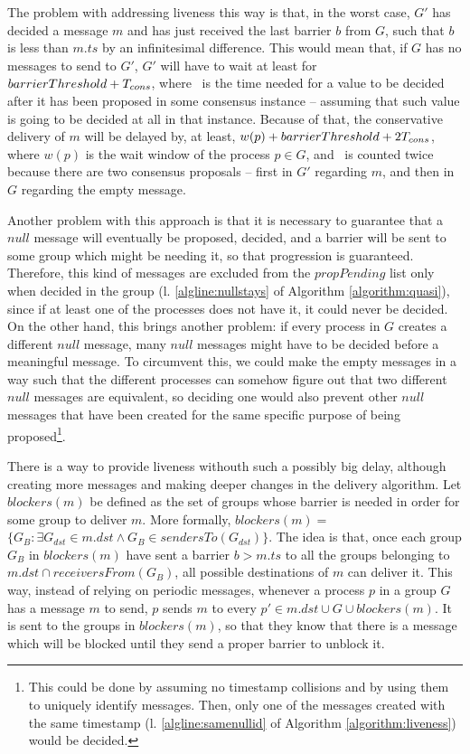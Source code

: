 \documentclass[times, 10pt]{article}
\begin{document}
The problem with addressing liveness this way is that, in the worst case, $G'$ has decided a message $m$ and has just received the last barrier $b$ from $G$, such that $b$ is less than $m.ts$ by an infinitesimal difference. This would mean that, if $G$ has no messages to send to $G'$, $G'$ will have to wait at least for $barrierThreshold + T_{cons}$, where \tcons\ is the time needed for a value to be decided after it has been proposed in some consensus instance -- assuming that such value is going to be decided at all in that instance. Because of that, the conservative delivery of $m$ will be delayed by, at least, $w(p) + barrierThreshold + 2T_{cons}$, where $w(p)$ is the wait window of the process $p \in G$, and \tcons\ is counted twice because there are two consensus proposals -- first in $G'$ regarding $m$, and then in $G$ regarding the empty message.

Another problem with this approach is that it is necessary to guarantee that a $null$ message will eventually be proposed, decided, and a barrier will be sent to some group which might be needing it, so that progression is guaranteed. Therefore, this kind of messages are excluded from the $propPending$ list only when decided in the group (l. \ref{algline:nullstays} of Algorithm \ref{algorithm:quasi}), since if at least one of the processes does not have it, it could never be decided. On the other hand, this brings another problem: if every process in $G$ creates a different $null$ message, many $null$ messages might have to be decided before a meaningful message. To circumvent this, we could make the empty messages in a way such that the different processes can somehow figure out that two different $null$ messages are equivalent, so deciding one would also prevent other $null$ messages that have been created for the same specific purpose of being proposed\footnote{This could be done by assuming no timestamp collisions and by using them to uniquely identify messages. Then, only one of the messages created with the same timestamp (l. \ref{algline:samenullid} of Algorithm \ref{algorithm:liveness}) would be decided.}.

There is a way to provide liveness withouth such a possibly big delay, although creating more messages and making deeper changes in the delivery algorithm. Let $blockers(m)$ be defined as the set of groups whose barrier is needed in order for some group to deliver $m$. More formally, $blockers(m) =$ \mbox{$\{G_B : \exists G_{dst} \in m.dst \wedge G_B \in sendersTo(G_{dst})\}$}. The idea is that, once each group $G_B$ in $blockers(m)$ have sent a barrier $b > m.ts$ to all the groups belonging to \mbox{$m.dst \cap receiversFrom(G_B)$}, all possible destinations of $m$ can deliver it. This way, instead of relying on periodic messages, whenever a process $p$ in a group $G$ has a message $m$ to send, $p$ sends $m$ to every $p' \in m.dst \cup G \cup blockers(m)$. It is sent to the groups in $blockers(m)$, so that they know that there is a message which will be blocked until they send a proper barrier to unblock it.
\end{document}
